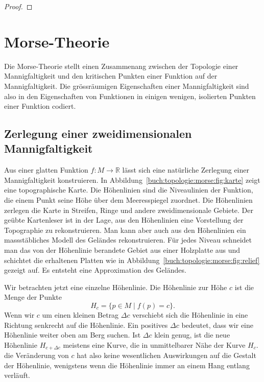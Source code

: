 \begin{proof}
\end{proof}

%
%
\section{Morse-Theorie}
Die Morse-Theorie stellt einen Zusammenang zwischen der Topologie einer 
Mannigfaltigkeit und den kritischen Punkten einer Funktion auf der
Mannigfaltigkeit.
Die grössräumigen Eigenschaften einer Mannigfaltigkeit sind also
in den Eigenschaften von Funktionen in einigen wenigen, isolierten
Punkten einer Funktion codiert.




%
%
\subsection{Zerlegung einer zweidimensionalen Mannigfaltigkeit}
%
%
Aus einer glatten Funktion $f\colon M\to\mathbb{R}$ lässt
sich eine natürliche Zerlegung einer Mannigfaltigkeit konstruieren.
In Abbildung~\ref{buch:topologie:morse:fig:karte} zeigt eine 
topographische Karte.
Die Höhenlinien sind die Niveaulinien der Funktion, die einem
Punkt seine Höhe über dem Meeresspiegel zuordnet.
Die Höhenlinien zerlegen die Karte in Streifen, Ringe und andere
zweidimensionale Gebiete.
Der geübte Kartenleser ist in der Lage, aus den Höhenlinien eine
Vorstellung der Topographie zu rekonstruieren.
Man kann aber auch aus den Höhenlinien ein massstäbliches Modell
des Geländes rekonstruieren.
Für jedes Niveau schneidet man das von der Höhenlinie berandete Gebiet
aus einer Holzplatte aus und schichtet die erhaltenen Platten
wie in Abbildung~\ref{buch:topologie:morse:fig:relief} gezeigt
auf.
Es entsteht eine Approximation des Geländes.

Wir betrachten jetzt eine einzelne Höhenlinie.
Die Höhenlinie zur Höhe $c$ ist die Menge der Punkte
\[
H_c
=
\{ p\in M\mid f(p) = c \}.
\]
Wenn wir $c$ um einen kleinen Betrag $\Delta c$ verschiebt sich
die Höhenlinie in eine Richtung senkrecht auf die Höhenlinie.
Ein positives $\Delta c$ bedeutet, dass wir eine Höhenlinie weiter
oben am Berg suchen.
Ist $\Delta c$ klein genug, ist die neue Höhenlinie $H_{c+\Delta c}$
meistens eine Kurve, die in unmittelbarer Nähe der Kurve $H_c$.
die Veränderung von $c$ hat also keine wesentlichen Auswirkungen
auf die Gestalt der Höhenlinie, wenigstens wenn die Höhenlinie
immer an einem Hang entlang verläuft.

